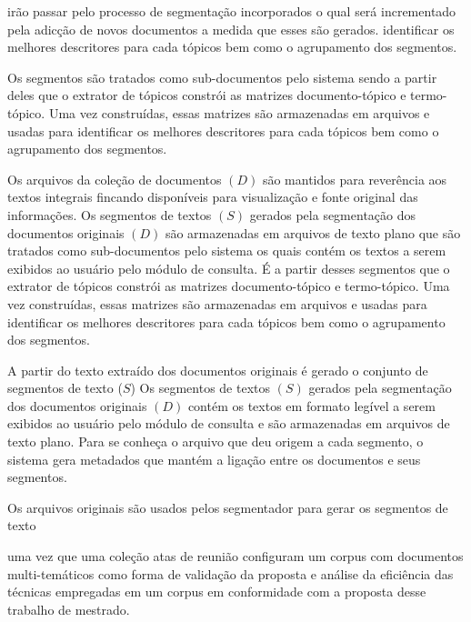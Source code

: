 irão passar pelo processo de segmentação 
incorporados 
o qual será incrementado pela adicção de novos documentos a medida que esses são gerados.
identificar os melhores descritores para cada tópicos bem como o agrupamento dos segmentos.

Os segmentos são tratados como sub-documentos pelo sistema sendo a partir deles que o extrator de tópicos constrói as matrizes documento-tópico e termo-tópico. Uma vez construídas, essas matrizes são armazenadas em arquivos e usadas para identificar os melhores descritores para cada tópicos bem como o agrupamento dos segmentos.

Os arquivos da coleção de documentos $(D)$ são mantidos para reverência aos textos integrais fincando disponíveis para visualização e fonte original das informações. Os segmentos de textos $(S)$ gerados pela segmentação dos documentos originais $(D)$ são armazenadas em arquivos de texto plano que são tratados como sub-documentos pelo sistema os quais contém os textos a serem exibidos ao usuário pelo módulo de consulta. É a partir desses segmentos que o extrator de tópicos constrói as matrizes documento-tópico e termo-tópico. Uma vez construídas, essas matrizes são armazenadas em arquivos e usadas para identificar os melhores descritores para cada tópicos bem como o agrupamento dos segmentos.

A partir do texto extraído dos documentos originais é gerado o conjunto de segmentos de texto ($S$)
Os segmentos de textos $(S)$ gerados pela segmentação dos documentos originais $(D)$ contém os textos em formato legível a serem exibidos ao usuário pelo módulo de consulta e são armazenadas em arquivos de texto plano. Para se conheça o arquivo que deu origem a cada segmento, o sistema gera metadados que mantém a ligação entre os documentos e seus segmentos. 




Os arquivos originais são usados pelos segmentador para gerar os segmentos de texto







uma vez que uma coleção atas de reunião configuram um corpus com documentos multi-temáticos
como forma de validação da proposta e análise da eficiência das técnicas empregadas em um corpus em conformidade com a proposta desse trabalho de mestrado.

